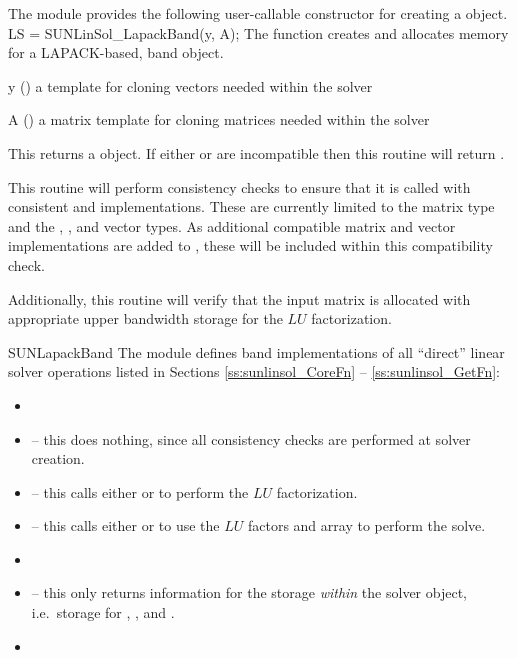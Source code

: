The {\sunlinsollapband} module provides the following user-callable constructor
for creating a \newline {} object.
%
%
{
  LS = SUNLinSol\_LapackBand(y, A);
}
{
  The function  creates and allocates memory for
  a LAPACK-based, band  object.
}
{
  \begin{args}[y]
  \item[y] ()
    a template for cloning vectors needed within the solver
  \item[A] ()
    a {\sunmatband} matrix template for cloning matrices needed
    within the solver 
  \end{args}
}
{
  This returns a  object.  If either  or
   are incompatible then this routine will return .
}
{
  This routine will perform consistency checks to ensure that it is
  called with consistent {\nvector} and {\sunmatrix} implementations.
  These are currently limited to the {\sunmatband} matrix type and
  the {\nvecs}, {\nvecopenmp}, and {\nvecpthreads} vector types.  As
  additional compatible matrix and vector implementations are added to
  {\sundials}, these will be included within this compatibility check.
  
  Additionally, this routine will verify that the input matrix 
  is allocated with appropriate upper bandwidth storage for the $LU$
  factorization.
}
{SUNLapackBand}
%
%
The {\sunlinsollapband} module defines band implementations of all
``direct'' linear solver operations listed in Sections
\ref{ss:sunlinsol_CoreFn} -- \ref{ss:sunlinsol_GetFn}:
\begin{itemize}
\item {}
\item {} -- this does nothing, since all
  consistency checks are performed at solver creation.
\item {} -- this calls either
   or  to perform the $LU$ factorization.
\item {} -- this calls either
   or  to use the $LU$ factors and 
  array to perform the solve.
\item {}
\item {} -- this only returns information for
  the storage \emph{within} the solver object, i.e.~storage
  for , , and .
\item {}
\end{itemize}


